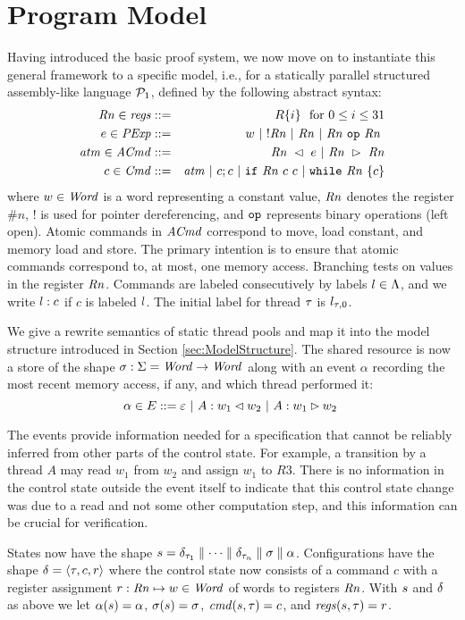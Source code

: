 \section{Program Model}
\label{sec:ProgramModel}

Having introduced the basic proof system, we now move on to instantiate this general framework to a specific model, i.e., for a
statically parallel structured assembly-like language $\mathcal{P}_1$, defined by the following abstract syntax:
\begin{eqnarray*}
\Rn\in\Registers & ::= & R\{i\}\ \text{ for } 0 \leq i \leq 31\\
e\in\PExp & ::= & w\ |\ !\Rn\ |\ \Rn\ |\ \Rn\ \Op\ \Rn \ \\
\atm{}\in\AtomicCmd &::= & \Rn\ \ReadFrom\ e\ |\ \Rn\ \WriteTo\ \Rn \\
c\in\Cmd & ::= &  \atm{}\ |\ c ; c\ |\ \If\ \Rn\ c\ c\ |\ \While\ \Rn\ \{c\}
\end{eqnarray*}
where $w\in\mathit{Word}$ is a word representing a constant value, $\mathit{Rn}$ denotes the register \#$n$, $!$ is used for pointer dereferencing, and $\texttt{op}$ represents binary operations (left open).
%
Atomic commands in $\mathit{ACmd}$ correspond to move, load constant, and memory load and store.
The primary intention is to ensure that atomic commands correspond to, at most, one memory access.  
Branching tests on values in the register $\mathit{Rn}$. Commands are labeled consecutively by labels $l\in\Lambda$, and we write $l:c$ if $c$ is labeled $l$. The initial label for thread $\tau$ is $l_{\tau,0}$.

We give a rewrite semantics of static thread pools and map it into the model structure introduced in Section \ref{sec:ModelStructure}. 
The shared resource is now a store of the shape $\sigma : \Sigma = \mathit{Word} \rightarrow \mathit{Word}$ along with an event $\alpha$ recording the most recent memory access, if
any, and which thread performed it:
\[
\alpha \in \Events ::= \varepsilon\ |\ A : w_1 \ReadFrom w_2 \ |\ A : w_1 \WriteTo w_2\ 
\]

The events provide information needed for a specification that cannot be reliably inferred from other parts of the control state. For example, a transition by a thread $A$ may read $w_1$ from $w_2$ and assign $w_1$ to $R3$. There is no information in the control state outside the event itself to indicate that this control state change was due to a read and not some other computation step, and this information can be crucial for verification.

States now have the shape $s = \delta_{\tau_1}\parallel \cdots \parallel \delta_{\tau_n}\parallel \sigma \parallel \alpha$.
Configurations have the shape $\delta=\langle \tau,c,r\rangle$ where the control state now consists of a command $c$ with a register assignment $r:\mathit{Rn}\mapsto w\in\mathit{Word}$ of words to registers $\mathit{Rn}$. With $s$ and $\delta$ as above we let $\alpha(s) = \alpha$, $\sigma(s)=\sigma$, $\mathit{cmd}(s,\tau)=c$, and $\mathit{regs}(s,\tau)=r$.

